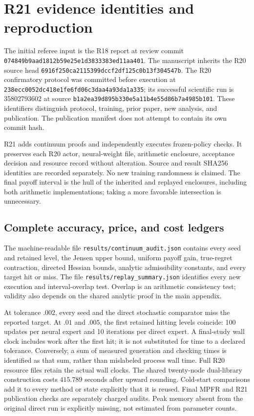 \section{R21 evidence identities and reproduction}\label{sec:r21evidence}
The initial referee input is the R18 report at review commit
\nolinkurl{074849b9aad1812b59e25e1d3833383ed11aa401}. The manuscript inherits the R20 source head
\nolinkurl{6916f250ca2115399dccf2df125c0b13f304547b}. The R20 confirmatory protocol was committed before execution at
\nolinkurl{238ecc0052dc418e1fe6fd06c3daa4a93da1a335}; its successful scientific run is 35802793602 at source
\nolinkurl{b1a2ea39d895b330e5a11b4e55d86b7a4985b101}.
These identifiers distinguish protocol, training, prior paper, new analysis, and publication. The publication manifest does not attempt to contain its own commit hash.

R21 adds continuum proofs and independently executes frozen-policy checks. It preserves each R20 actor, neural-weight file, arithmetic enclosure, acceptance decision and resource record without alteration. Source and result SHA256 identities are recorded separately. No new training randomness is claimed. The final payoff interval is the hull of the inherited and replayed enclosures, including both arithmetic implementations; taking a more favorable intersection is unnecessary.

\subsection{Complete accuracy, price, and cost ledgers}
The machine-readable file \nolinkurl{results/continuum\_audit.json} contains every seed and retained level, the Jensen upper bound, uniform payoff gain, true-regret contraction, directed Hessian bounds, analytic admissibility constants, and every target hit or miss. The file \nolinkurl{results/replay\_summary.json} identifies every new execution and interval-overlap test. Overlap is an arithmetic consistency test; validity also depends on the shared analytic proof in the main appendix.



At tolerance $.002$, every seed and the direct stochastic comparator miss the reported target. At $.01$ and $.005$, the first retained hitting levels coincide: 100 updates per neural expert and 10 iterations per direct expert. A final-study wall clock includes work after the first hit; it is not substituted for time to a declared tolerance. Conversely, a sum of measured generation and checking times is identified as that sum, rather than mislabeled process wall time. Full R20 resource files retain the actual wall clocks. The shared twenty-node dual-library construction costs $415.789$ seconds after upward rounding. Cold-start comparisons add it to every method or state explicitly that it is reused. Final MPFR and R21 publication checks are separately charged audits. Peak memory absent from the original direct run is explicitly missing, not estimated from parameter counts.

